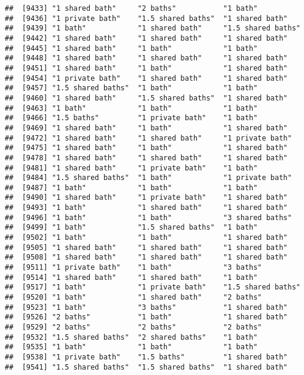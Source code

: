 \documentclass[
]{article}
\begin{document}
\begin{verbatim}
##  [9433] "1 shared bath"     "2 baths"           "1 bath"           
##  [9436] "1 private bath"    "1.5 shared baths"  "1 shared bath"    
##  [9439] "1 bath"            "1 shared bath"     "1.5 shared baths" 
##  [9442] "1 shared bath"     "1 shared bath"     "1 shared bath"    
##  [9445] "1 shared bath"     "1 bath"            "1 bath"           
##  [9448] "1 shared bath"     "1 shared bath"     "1 shared bath"    
##  [9451] "1 shared bath"     "1 bath"            "1 shared bath"    
##  [9454] "1 private bath"    "1 shared bath"     "1 shared bath"    
##  [9457] "1.5 shared baths"  "1 bath"            "1 bath"           
##  [9460] "1 shared bath"     "1.5 shared baths"  "1 shared bath"    
##  [9463] "1 bath"            "1 bath"            "1 bath"           
##  [9466] "1.5 baths"         "1 private bath"    "1 bath"           
##  [9469] "1 shared bath"     "1 bath"            "1 shared bath"    
##  [9472] "1 shared bath"     "1 shared bath"     "1 private bath"   
##  [9475] "1 shared bath"     "1 bath"            "1 shared bath"    
##  [9478] "1 shared bath"     "1 shared bath"     "1 shared bath"    
##  [9481] "1 shared bath"     "1 private bath"    "1 bath"           
##  [9484] "1.5 shared baths"  "1 bath"            "1 private bath"   
##  [9487] "1 bath"            "1 bath"            "1 bath"           
##  [9490] "1 shared bath"     "1 private bath"    "1 shared bath"    
##  [9493] "1 bath"            "1 shared bath"     "1 shared bath"    
##  [9496] "1 bath"            "1 bath"            "3 shared baths"   
##  [9499] "1 bath"            "1.5 shared baths"  "1 bath"           
##  [9502] "1 bath"            "1 bath"            "1 shared bath"    
##  [9505] "1 shared bath"     "1 shared bath"     "1 shared bath"    
##  [9508] "1 shared bath"     "1 shared bath"     "1 shared bath"    
##  [9511] "1 private bath"    "1 bath"            "3 baths"          
##  [9514] "1 shared bath"     "1 shared bath"     "1 bath"           
##  [9517] "1 bath"            "1 private bath"    "1.5 shared baths" 
##  [9520] "1 bath"            "1 shared bath"     "2 baths"          
##  [9523] "1 bath"            "3 baths"           "1 shared bath"    
##  [9526] "2 baths"           "1 bath"            "1 shared bath"    
##  [9529] "2 baths"           "2 baths"           "2 baths"          
##  [9532] "1.5 shared baths"  "2 shared baths"    "1 bath"           
##  [9535] "1 bath"            "1 bath"            "1 bath"           
##  [9538] "1 private bath"    "1.5 baths"         "1 shared bath"    
##  [9541] "1.5 shared baths"  "1.5 shared baths"  "1 shared bath"    

\end{verbatim}
\end{document}

